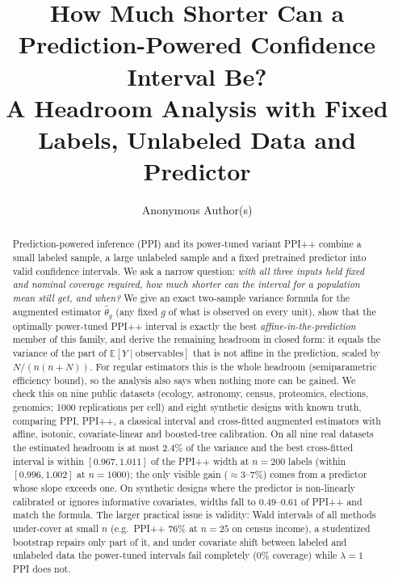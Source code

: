 \documentclass{article}
\title{How Much Shorter Can a Prediction-Powered Confidence Interval Be?\\ A Headroom Analysis with Fixed Labels, Unlabeled Data and Predictor}
\author{Anonymous Author(s)}
\newcommand{\E}{\mathbb{E}}
\begin{document}
\maketitle

\begin{abstract}
Prediction-powered inference (PPI) and its power-tuned variant PPI++ combine a small labeled sample, a large unlabeled sample and a fixed pretrained predictor into valid confidence intervals. We ask a narrow question: \emph{with all three inputs held fixed and nominal coverage required, how much shorter can the interval for a population mean still get, and when?}
We give an exact two-sample variance formula for the augmented estimator $\hat\theta_g$ (any fixed $g$ of what is observed on every unit), show that the optimally power-tuned PPI++ interval is exactly the best \emph{affine-in-the-prediction} member of this family, and derive the remaining headroom in closed form: it equals the variance of the part of $\E[Y\mid\text{observables}]$ that is not affine in the prediction, scaled by $N/(n(n+N))$. For regular estimators this is the whole headroom (semiparametric efficiency bound), so the analysis also says when nothing more can be gained.
We check this on nine public datasets (ecology, astronomy, census, proteomics, elections, genomics; 1000 replications per cell) and eight synthetic designs with known truth, comparing PPI, PPI++, a classical interval and cross-fitted augmented estimators with affine, isotonic, covariate-linear and boosted-tree calibration. On all nine real datasets the estimated headroom is at most $2.4\%$ of the variance and the best cross-fitted interval is within $[0.967,1.011]$ of the PPI++ width at $n=200$ labels (within $[0.996,1.002]$ at $n=1000$); the only visible gain ($\approx3$--$7\%$) comes from a predictor whose slope exceeds one. On synthetic designs where the predictor is non-linearly calibrated or ignores informative covariates, widths fall to $0.49$--$0.61$ of PPI++ and match the formula. The larger practical issue is validity: Wald intervals of all methods under-cover at small $n$ (e.g.\ PPI++ $76\%$ at $n=25$ on census income), a studentized bootstrap repairs only part of it, and under covariate shift between labeled and unlabeled data the power-tuned intervals fail completely ($0\%$ coverage) while $\lambda=1$ PPI does not.
\end{abstract}
\end{document}
